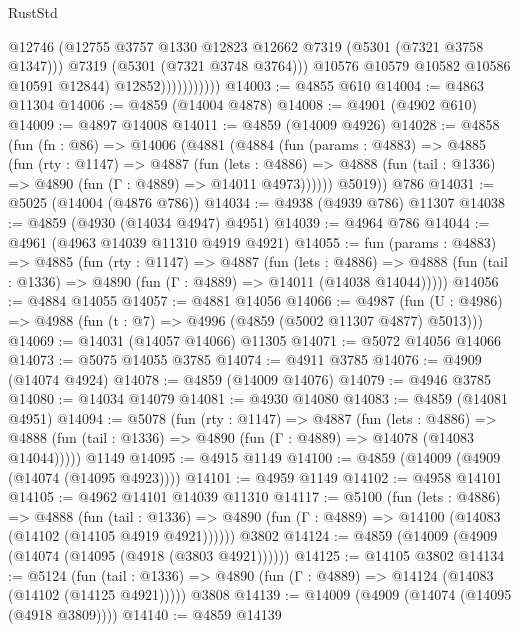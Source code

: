 \begin{lexlean}{RustStd}
\begin{coremodule}
                              @12746
                              (@12755 @3757 @1330 @12823 @12662 @7319 (@5301 (@7321 @3758 @1347)))
                              @7319
                              (@5301 (@7321 @3748 @3764)))
                            @10576
                            @10579
                            @10582
                            @10586
                            @10591
                            @12844)
                          @12852)))))))))))
@14003 := @4855 @610
@14004 := @4863 @11304
@14006 := @4859 (@14004 @4878)
@14008 := @4901 (@4902 @610)
@14009 := @4897 @14008
@14011 := @4859 (@14009 @4926)
@14028 := @4858
    (fun (fn : @86) =>
    @14006
      (@4881
        (@4884
          (fun (params : @4883) =>
          @4885
            (fun (rty : @1147) =>
            @4887
              (fun (lets : @4886) =>
              @4888 (fun (tail : @1336) => @4890 (fun (Γ : @4889) => @14011 @4973))))))
        @5019))
    @786
@14031 := @5025 (@14004 (@4876 @786))
@14034 := @4938 (@4939 @786) @11307
@14038 := @4859 (@4930 (@14034 @4947) @4951)
@14039 := @4964 @786
@14044 := @4961 (@4963 @14039 @11310 @4919 @4921)
@14055 := fun (params : @4883) =>
  @4885
    (fun (rty : @1147) =>
    @4887
      (fun (lets : @4886) =>
      @4888 (fun (tail : @1336) => @4890 (fun (Γ : @4889) => @14011 (@14038 @14044)))))
@14056 := @4884 @14055
@14057 := @4881 @14056
@14066 := @4987
    (fun (U : @4986) => @4988 (fun (t : @7) => @4996 (@4859 (@5002 @11307 @4877) @5013)))
@14069 := @14031 (@14057 @14066) @11305
@14071 := @5072 @14056 @14066
@14073 := @5075 @14055 @3785
@14074 := @4911 @3785
@14076 := @4909 (@14074 @4924)
@14078 := @4859 (@14009 @14076)
@14079 := @4946 @3785
@14080 := @14034 @14079
@14081 := @4930 @14080
@14083 := @4859 (@14081 @4951)
@14094 := @5078
    (fun (rty : @1147) =>
    @4887
      (fun (lets : @4886) =>
      @4888 (fun (tail : @1336) => @4890 (fun (Γ : @4889) => @14078 (@14083 @14044)))))
    @1149
@14095 := @4915 @1149
@14100 := @4859 (@14009 (@4909 (@14074 (@14095 @4923))))
@14101 := @4959 @1149
@14102 := @4958 @14101
@14105 := @4962 @14101 @14039 @11310
@14117 := @5100
    (fun (lets : @4886) =>
    @4888
      (fun (tail : @1336) =>
      @4890 (fun (Γ : @4889) => @14100 (@14083 (@14102 (@14105 @4919 @4921))))))
    @3802
@14124 := @4859 (@14009 (@4909 (@14074 (@14095 (@4918 (@3803 @4921))))))
@14125 := @14105 @3802
@14134 := @5124
    (fun (tail : @1336) => @4890 (fun (Γ : @4889) => @14124 (@14083 (@14102 (@14125 @4921)))))
    @3808
@14139 := @14009 (@4909 (@14074 (@14095 (@4918 @3809))))
@14140 := @4859 @14139

\end{coremodule}
\end{lexlean}

